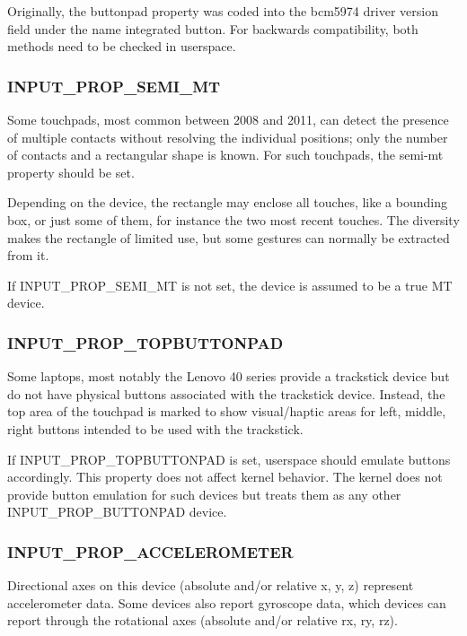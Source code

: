 \documentclass[a4paper,8pt,english]{sphinxmanual}
\begin{document}
Originally, the buttonpad property was coded into the bcm5974 driver
version field under the name integrated button. For backwards
compatibility, both methods need to be checked in userspace.


\subsubsection{INPUT\_PROP\_SEMI\_MT}
\label{input/event-codes:input-prop-semi-mt}
Some touchpads, most common between 2008 and 2011, can detect the presence
of multiple contacts without resolving the individual positions; only the
number of contacts and a rectangular shape is known. For such
touchpads, the semi-mt property should be set.

Depending on the device, the rectangle may enclose all touches, like a
bounding box, or just some of them, for instance the two most recent
touches. The diversity makes the rectangle of limited use, but some
gestures can normally be extracted from it.

If INPUT\_PROP\_SEMI\_MT is not set, the device is assumed to be a true MT
device.


\subsubsection{INPUT\_PROP\_TOPBUTTONPAD}
\label{input/event-codes:input-prop-topbuttonpad}
Some laptops, most notably the Lenovo 40 series provide a trackstick
device but do not have physical buttons associated with the trackstick
device. Instead, the top area of the touchpad is marked to show
visual/haptic areas for left, middle, right buttons intended to be used
with the trackstick.

If INPUT\_PROP\_TOPBUTTONPAD is set, userspace should emulate buttons
accordingly. This property does not affect kernel behavior.
The kernel does not provide button emulation for such devices but treats
them as any other INPUT\_PROP\_BUTTONPAD device.


\subsubsection{INPUT\_PROP\_ACCELEROMETER}
\label{input/event-codes:input-prop-accelerometer}
Directional axes on this device (absolute and/or relative x, y, z) represent
accelerometer data. Some devices also report gyroscope data, which devices
can report through the rotational axes (absolute and/or relative rx, ry, rz).
\end{document}
